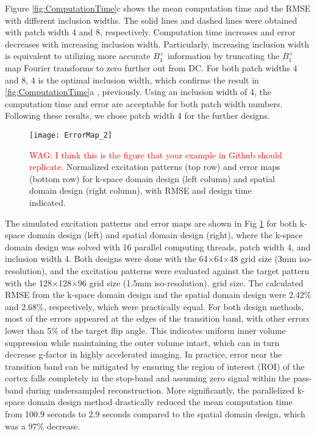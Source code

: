 Figure \ref{fig:ComputationTime}c shows the mean computation time and the RMSE with different inclusion widths. The solid lines and dashed lines were obtained with patch width 4 and 8, respectively. Computation time increases and error decreases with increasing inclusion width. Particularly, increasing inclusion width is equivalent to utilizing more accurate $B_1^+$ information by truncating the $B_1^+$ map Fourier transforms to zero further out from DC. For both patch widths 4 and 8, 4 is the optimal inclusion width, which confirms the result in \ref{fig:ComputationTime}a , previously. Using an inclusion width of 4, the computation time and error are acceptable for both patch width numbers. Following these results,  we chose patch width 4 for the further designs.

\begin{figure}
	\centering
	\texttt{[image: ErrorMap\_2]}
	\caption{\textcolor{red}{WAG: I think this is the figure that your example in Github should replicate.}
	Normalized excitation patterns (top row) and error maps (bottom row) for k-space domain design (left column) and spatial domain design (right column), with RMSE and design time indicated.}
	\label{fig:ErrorMap}
\end{figure}
The simulated excitation patterns and error maps are shown in Fig \ref{fig:ErrorMap} for both k-space domain design (left) and spatial domain design (right), where the k-space domain design was solved with 16 parallel computing threads, patch width 4, and inclusion width 4. 
Both designs were done with the 64$\times$64$\times$48 grid size (3mm iso-resolution), and the excitation patterns were evaluated against the target pattern with the 128$\times$128$\times$96 grid size (1.5mm iso-resolution).  grid size. 
The calculated RMSE from the k-space domain design and the spatial domain design were 2.42\% and 2.68\%, respectively, which were practically equal. For both design methods, most of the errors appeared at the edges of the transition band, with other errors lower than 5\% of the target flip angle. This indicates uniform inner volume suppression while maintaining the outer volume intact, which can in turn decrease g-factor in highly accelerated imaging. In practice, error near the transition band can be mitigated by ensuring the region of interest (ROI) of the cortex falls completely in the stop-band and assuming zero signal within the pass-band during undersampled reconstruction. More significantly, the parallelized k-space domain design method drastically reduced the mean computation time from 100.9 seconds to 2.9 seconds compared to the spatial domain design, which was a 97\% decrease.


